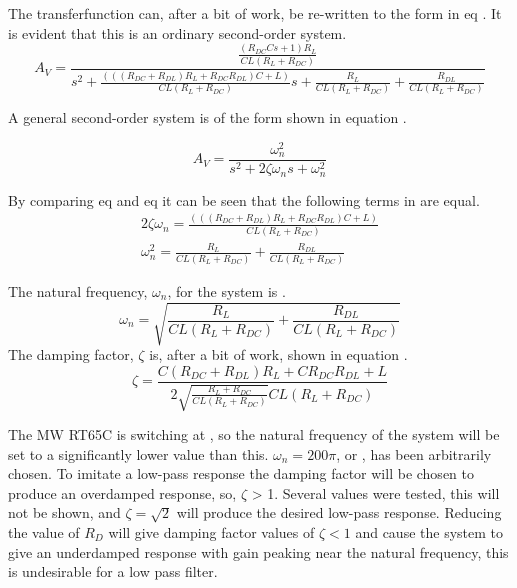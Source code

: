 The transferfunction  can, after a bit of work, be re-written to the form in eq . It is evident that this is an ordinary second-order system.
\begin{equation}\label{eq:7_1_5_FILTF2}
    A_V = \frac{   \frac{(R_{DC}Cs + 1)R_L}{CL(R_L+R_{DC})}}{s^2 + \frac{(((R_{DC}+R_{DL})R_L + R_{DC}R_{DL})C+L)}{CL(R_L + R_{DC})}s + \frac{R_L}{CL(R_L + R_{DC})} + \frac{R_{DL}}{CL(R_L + R_{DC})}} 
\end{equation}

A general second-order system is of the form shown in equation . 

\begin{equation}\label{eq:7_1_5_GENTF}
    A_V = \frac{\omega_n^2}{s^2 + 2\zeta\omega_ns+\omega_n^2}
\end{equation}

By comparing eq  and eq  it can be seen that the following terms in are equal.
\begin{equation}\label{eq:7_1_5_TFFACTORS} 
    \begin{aligned}
        2\zeta\omega_n = \frac{(((R_{DC}+R_{DL})R_L + R_{DC}R_{DL})C+L)}{CL(R_L + R_{DC})} \\
        \omega_n^2 = \frac{R_L}{CL(R_L + R_{DC})} + \frac{R_{DL}}{CL(R_L + R_{DC})}
    \end{aligned}
\end{equation}

The natural frequency, $\omega_n$, for the system is .
\begin{equation}\label{eq:7_1_5_NATFRQ}
    \omega_n = \sqrt{\frac{R_L}{CL(R_L + R_{DC})} + \frac{R_{DL}}{CL(R_L+R_{DC})}}
\end{equation}
The damping factor, $\zeta$ is, after a bit of work, shown in equation .
\begin{equation}\label{eq:7_1_5_DAMPF}
    \zeta = \frac{C(R_{DC}+R_{DL})R_L + CR_{DC}R_{DL} + L}{2\sqrt{\frac{R_L +R_{DC}}{CL(R_L + R_{DC})}}CL(R_L+R_{DC})}
\end{equation}

The MW RT65C is switching at , so the natural frequency of the system will be set to a significantly lower value than this. $\omega_n = 200\pi$, or , has been arbitrarily chosen. To imitate a low-pass response the damping factor will be chosen to produce an overdamped response, so, $\zeta$ > 1. Several values were tested, this will not be shown, and $\zeta = \sqrt{2}$ will produce the desired low-pass response. Reducing the value of $R_D$ will give damping factor values of $\zeta < 1$ and cause the system to give an underdamped response with gain peaking near the natural frequency, this is undesirable for a low pass filter.

